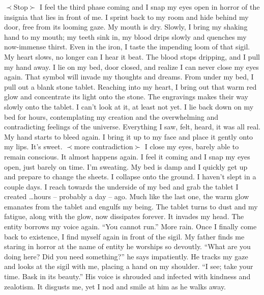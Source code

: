 \documentclass[openany, 12pt]{book}
\newcommand\tab[1][1cm]{\hspace*{#1}}
\begin{document}
$\prec$Stop$\succ$\newline
\tab
I feel the third phase coming and I snap my eyes open in horror of the insignia that lies in front of me.
I sprint back to my room and hide behind my door, free from its looming gaze. My mouth is dry. Slowly, I bring my shaking hand to my mouth; my teeth sink in, my blood drips slowly and quenches my now-immense thirst. Even in the iron, I taste the impending loom of that sigil. My heart slows, no longer can I hear it beat. The blood stops dripping, and I pull my hand away.
\newline
\tab
I lie on my bed, door closed, and realize I can never close my eyes again. That symbol will invade my thoughts and dreams.
From under my bed, I pull out a blank stone tablet. Reaching into my heart, I bring out that warm red glow and concentrate its light onto the stone. The engravings makes their way slowly onto the tablet. I can’t look at it, at least not yet.\newline
\tab
I lie back down on my bed for hours, contemplating my creation and the overwhelming and contradicting feelings of the universe. Everything I saw, felt, heard, it was all real. My hand starts to bleed again. I bring it up to my face and place it gently onto my lips. It’s sweet.\newline
$\prec$more contradiction$\succ$\newline
\tab
I close my eyes, barely able to remain conscious. It almost happens again. I feel it coming and I snap my eyes open, just barely on time. I’m sweating. My bed is damp and I quickly get up and prepare to change the sheets. I collapse onto the ground. I haven’t slept in a couple days.\newline
\tab
I reach towards the underside of my bed and grab the tablet I created …hours – probably a day – ago. Much like the last one, the warm glow emanates from the tablet and engulfs my being. The tablet turns to dust and my fatigue, along with the glow, now dissipates forever.\newline
\tab
It invades my head. The entity borrows my voice again. “You cannot run.” More rain. Once I finally come back to existence, I find myself again in front of the sigil. My father finds me staring in horror at the name of entity he worships so devoutly.\newline
\tab
“What are you doing here? Did you need something?” he says impatiently. He tracks my gaze and looks at the sigil with me, placing a hand on my shoulder. “I see; take your time. Bask in its beauty.” His voice is shrouded and infected with kindness and zealotism. It disgusts me, yet I nod and smile at him as he walks away.\newline
\end{document}

